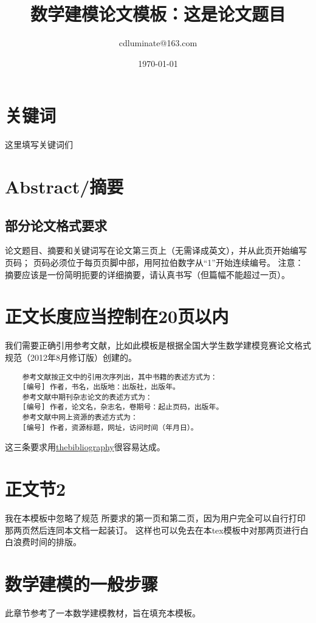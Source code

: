 \documentclass[10pt,a4paper]{article}
\title{数学建模论文模板：这是论文题目}
\author{cdluminate@163.com}
\date{\today}
\begin{document}
\begin{CJK}{UTF8}{gbsn}
\thispagestyle{empty}
\maketitle

\section*{关键词}
这里填写关键词们

\section*{Abstract/摘要}
\subsection*{部分论文格式要求}
论文题目、摘要和关键词写在论文第三页上（无需译成英文），并从此页开始编写页码；
页码必须位于每页页脚中部，用阿拉伯数字从“1”开始连续编号。
注意：摘要应该是一份简明扼要的详细摘要，请认真书写（但篇幅不能超过一页）。

\newpage

\section{正文长度应当控制在20页以内}
我们需要正确引用参考文献，比如此模板是根据全国大学生数学建模竞赛论文格式规范（2012年8月修订版）\cite{bib:plate}创建的。
	\begin{verbatim}
	参考文献按正文中的引用次序列出，其中书籍的表述方式为：
	[编号] 作者，书名，出版地：出版社，出版年。
	参考文献中期刊杂志论文的表述方式为：
	[编号] 作者，论文名，杂志名，卷期号：起止页码，出版年。
	参考文献中网上资源的表述方式为：
	[编号] 作者，资源标题，网址，访问时间（年月日）。
	\end{verbatim}
这三条要求用\underline{thebibliography}很容易达成。

\section{正文节2}
我在本模板中忽略了规范\cite{bib:plate} 所要求的第一页和第二页，因为用户完全可以自行打印那两页然后连同本文档一起装订。
这样也可以免去在本tex模板中对那两页进行白白浪费时间的排版。

\section{数学建模的一般步骤}
此章节参考了一本数学建模教材\cite{bib:mm}，旨在填充本模板。

\end{CJK}
\end{document}

